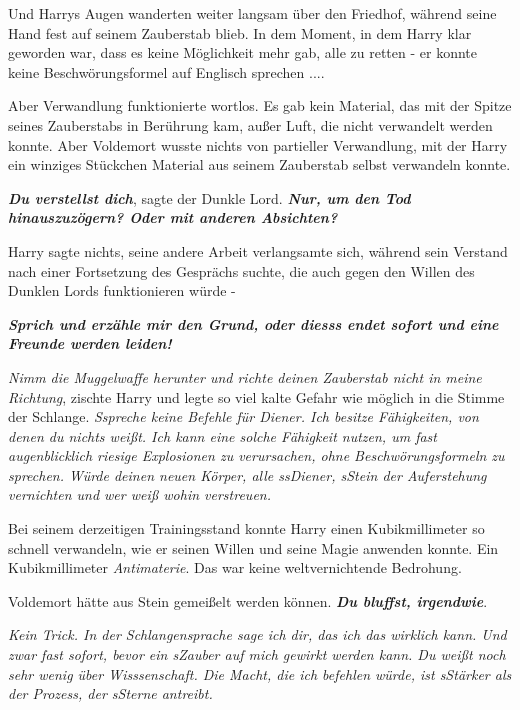 Und Harrys Augen wanderten weiter langsam über den Friedhof, während seine Hand
fest auf seinem Zauberstab blieb. In dem Moment, in dem Harry klar geworden war,
dass es keine Möglichkeit mehr gab, alle zu retten - er konnte keine
Beschwörungsformel auf Englisch sprechen ....

Aber Verwandlung funktionierte wortlos. Es gab kein Material, das mit der Spitze
seines Zauberstabs in Berührung kam, außer Luft, die nicht verwandelt werden
konnte. Aber Voldemort wusste nichts von partieller Verwandlung, mit der Harry
ein winziges Stückchen Material aus seinem Zauberstab selbst verwandeln konnte.

\glqq{}\textbf{\emph{Du verstellst dich}}\grqq{}, sagte der Dunkle Lord. \glqq{}
\textbf{\emph{Nur, um den Tod hinauszuzögern? Oder mit anderen Absichten?}}\grqq{}

Harry sagte nichts, seine andere Arbeit verlangsamte sich, während sein Verstand
nach einer Fortsetzung des Gesprächs suchte, die auch gegen den Willen des
Dunklen Lords funktionieren würde -

\glqq{}\textbf{\emph{Sprich und erzähle mir den Grund, oder diesss endet sofort
und eine Freunde werden leiden!}}\grqq{}

\glqq{}\emph{Nimm die Muggelwaffe herunter und richte deinen Zauberstab nicht in
meine Richtung}\grqq{}, zischte Harry und legte so viel kalte Gefahr wie möglich
in die Stimme der Schlange. \glqq{}\emph{Sspreche keine Befehle für Diener. Ich
besitze Fähigkeiten, von denen du nichts weißt. Ich kann eine solche Fähigkeit
nutzen, um fast augenblicklich riesige Explosionen zu verursachen, ohne
Beschwörungsformeln zu sprechen. Würde deinen neuen Körper, alle ssDiener,
sStein der Auferstehung vernichten und wer weiß wohin verstreuen.}\grqq{}

Bei seinem derzeitigen Trainingsstand konnte Harry einen Kubikmillimeter so
schnell verwandeln, wie er seinen Willen und seine Magie anwenden konnte. Ein
Kubikmillimeter \emph{Antimaterie}. Das war keine weltvernichtende Bedrohung.

Voldemort hätte aus Stein gemeißelt werden können. \glqq{}\textbf{\emph{Du
bluffst, irgendwie}}.\grqq{}

\glqq{}\emph{Kein Trick. In der Schlangensprache sage ich dir, das ich das
wirklich kann. Und zwar fast sofort, bevor ein sZauber auf mich gewirkt werden
kann. Du weißt noch sehr wenig über Wisssenschaft. Die Macht, die ich befehlen
würde, ist sStärker als der Prozess, der sSterne antreibt.}\grqq{}

